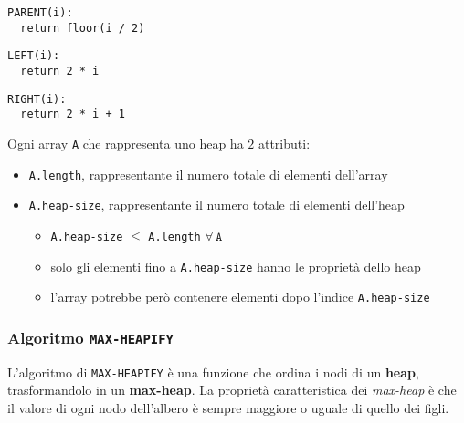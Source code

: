 \documentclass[italian, 10pt]{article}
\begin{document}
\begin{center}
  \begin{minipage}{0.31\textwidth}
    \centering
    \begin{lstlisting}[style=pseudocode, numbers=none]
PARENT(i):
  return floor(i / 2)
\end{lstlisting}
  \end{minipage}
  \begin{minipage}{0.3\textwidth}
    \begin{lstlisting}[style=pseudocode, xleftmargin=20pt, xrightmargin=20pt, numbers=none]
LEFT(i):
  return 2 * i
\end{lstlisting}
  \end{minipage}
  \begin{minipage}{0.3\textwidth}
    \begin{lstlisting}[style=pseudocode, numbers=none]
RIGHT(i):
  return 2 * i + 1
\end{lstlisting}
  \end{minipage}
\end{center}

Ogni array \texttt{A} che rappresenta uno heap ha \(2\) attributi:

\begin{itemize}
  \item \texttt{A.length}, rappresentante il numero totale di elementi dell'array
  \item \texttt{A.heap-size}, rappresentante il numero totale di elementi dell'heap
        \begin{itemize}
          \item \texttt{A.heap-size} \(\leq\) \texttt{A.length} \(\forall \, \texttt{A}\)
          \item solo gli elementi fino a \texttt{A.heap-size} hanno le proprietà dello heap
          \item l'array potrebbe però contenere elementi dopo l'indice \texttt{A.heap-size}
        \end{itemize}
\end{itemize}

\subsubsection{Algoritmo \texttt{MAX-HEAPIFY}}
\label{sec:algoritmo-max-heapify}

L'algoritmo di \texttt{MAX-HEAPIFY} è una funzione che ordina i nodi di un \textbf{heap}, trasformandolo in un \textbf{max-heap}.
La proprietà caratteristica dei \textit{max-heap} è che il valore di ogni nodo dell'albero è sempre maggiore o uguale di quello dei figli.
\end{document}
